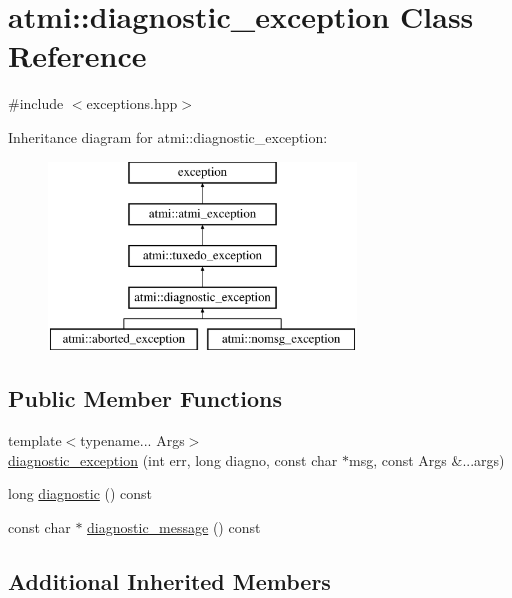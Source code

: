 \hypertarget{classatmi_1_1diagnostic__exception}{}\section{atmi\+:\+:diagnostic\+\_\+exception Class Reference}
\label{classatmi_1_1diagnostic__exception}


{\ttfamily \#include $<$exceptions.\+hpp$>$}

Inheritance diagram for atmi\+:\+:diagnostic\+\_\+exception\+:\begin{figure}[H]
\begin{center}
\leavevmode
\includegraphics[height=5.000000cm]{classatmi_1_1diagnostic__exception}
\end{center}
\end{figure}
\subsection*{Public Member Functions}
\begin{DoxyCompactItemize}
\item 
{\footnotesize template$<$typename... Args$>$ }\\\hyperlink{classatmi_1_1diagnostic__exception_acf086c2efbe447d733a02988e56be370}{diagnostic\+\_\+exception} (int err, long diagno, const char $\ast$msg, const Args \&...args)
\item 
long \hyperlink{classatmi_1_1diagnostic__exception_a5602718873c6e8122af75d5adf9d375b}{diagnostic} () const 
\item 
const char $\ast$ \hyperlink{classatmi_1_1diagnostic__exception_a60931362229b54fc6847a3efa5e83ffd}{diagnostic\+\_\+message} () const 
\end{DoxyCompactItemize}
\subsection*{Additional Inherited Members}


